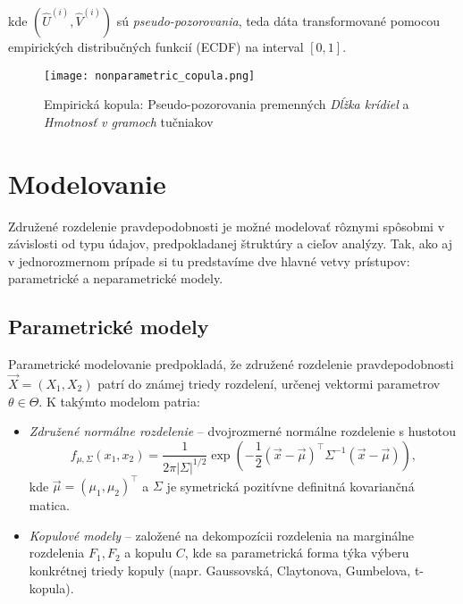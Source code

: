 kde $\left(\hat{U}^{(i)}, \hat{V}^{(i)}\right)$ sú \textit{pseudo-pozorovania}, teda dáta transformované pomocou empirických distribučných funkcií (ECDF) na interval $[0,1]$.

\begin{figure}[H]
    \centering
    \texttt{[image: nonparametric\_copula.png]}
    \caption{Empirická kopula: Pseudo-pozorovania premenných \textit{Dĺžka krídiel} a \textit{Hmotnosť v gramoch} tučniakov}
    \label{fig:nonparametric_copula}
\end{figure}

\section{Modelovanie}\label{sec:modelovanie}

Združené rozdelenie pravdepodobnosti je možné modelovať rôznymi spôsobmi v závislosti od typu údajov, predpokladanej štruktúry a cieľov analýzy. Tak, ako aj v jednorozmernom prípade si tu predstavíme dve hlavné vetvy prístupov: parametrické a neparametrické modely.

\subsection{Parametrické modely}\label{subsec:joint_param_models}

Parametrické modelovanie predpokladá, že združené rozdelenie pravdepodobnosti $\vec{X} = (X_1, X_2)$ patrí do známej triedy rozdelení, určenej vektormi parametrov $\theta \in \Theta$. K takýmto modelom patria:

\begin{itemize}
  \item \textit{Združené normálne rozdelenie} – dvojrozmerné normálne rozdelenie s hustotou
  \begin{equation}
  f_{\mu, \Sigma}(x_1, x_2) = \frac{1}{2\pi |\Sigma|^{1/2}} \exp\left( -\frac{1}{2} (\vec{x} - \vec{\mu})^\top \Sigma^{-1} (\vec{x} - \vec{\mu}) \right),
  \end{equation}
  kde $\vec{\mu} = (\mu_1, \mu_2)^\top$ a $\Sigma$ je symetrická pozitívne definitná kovariančná matica.
  
  \item \textit{Kopulové modely} – založené na dekompozícii rozdelenia na marginálne rozdelenia $F_1, F_2$ a kopulu $C$, kde sa parametrická forma týka výberu konkrétnej triedy kopuly (napr. Gaussovská, Claytonova, Gumbelova, t-kopula).
\end{itemize}

